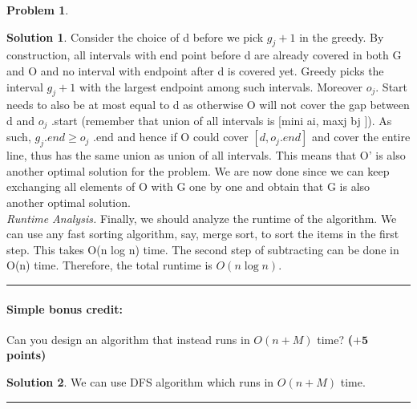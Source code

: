 \documentclass{article}
\theoremstyle{definition}
\newtheorem{problem}{Problem}
\def\fline{\rule{0.75\linewidth}{0.5pt}}
\newcommand{\finishline}{\begin{center}\fline\end{center}}
\newtheorem*{solution*}{Solution}
\newenvironment{solution}{\begin{solution*}}{{\finishline} \end{solution*}}
\newcommand{\grade}[1]{\hfill{\textbf{($\mathbf{#1}$ points)}}}
\begin{document}
\begin{problem}
\begin{solution}
	Consider the choice of d before we pick $g_j+1$ in the greedy. By construction, all intervals with end point before d are already covered in both G and O and no interval with endpoint after d is covered yet. Greedy picks the interval $g_j+1$ with the largest endpoint among such intervals. Moreover $o_j$. Start needs to also be at most equal to d as otherwise O will not cover the gap between d and $o_j$ .start (remember that union of all intervals is [mini ai, maxj bj ]). As such, $g_j.end \geq o_j$ .end and hence if O could cover $[d, o_j.end]$ and cover the entire line, thus has the same union as union of all intervals. This means that O' is also another optimal solution for the problem. We are now done since we can keep exchanging all elements of O with G one by one and obtain that G is also another optimal solution. \\
			
	\emph{Runtime Analysis.} Finally, we should analyze the runtime of the algorithm. We can use any fast sorting algorithm, say, merge sort, to sort the items in the first step. This takes O(n log n) time. The second step of subtracting can be done in O(n) time. Therefore, the total runtime is $O(n\log{n})$. \\

\end{solution}	

	\paragraph{Simple bonus credit:} Can you design an algorithm that instead runs in $O(n+M)$ time? \grade{+5}
	
	
	\bigskip
	
\begin{solution}

	We can use DFS algorithm which runs in $O(n+M)$ time.
	
\end{solution}	

\end{problem}

\medskip
\end{document}
